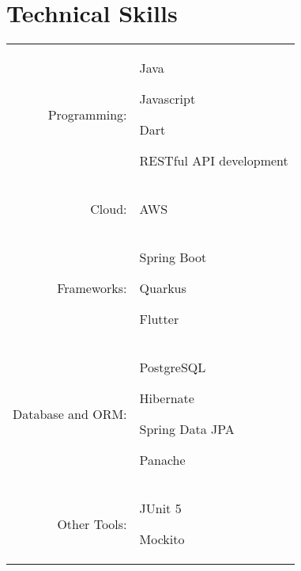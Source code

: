 \documentclass[a4paper,12pt]{article}
\begin{document}

\section{Technical Skills}
\vspace{2pt}
\begin{tabular}{rp{15.2cm}}
\raggedleft Programming:
& \begin{itemize*}[label=\Large\textbullet] %
    \item Java
    \item Javascript
    \item Dart
    \item RESTful API development
\end{itemize*}\\
\raggedleft Cloud:
& \begin{itemize*}[label=\Large\textbullet]
    \item AWS
\end{itemize*}\\
\raggedleft Frameworks:
& \begin{itemize*}[label=\Large\textbullet]
    \item Spring Boot
    \item Quarkus
    \item Flutter
\end{itemize*}\\
\raggedleft Database and ORM:
& \begin{itemize*}[label=\Large\textbullet]
    \item PostgreSQL
    \item Hibernate
    \item Spring Data JPA
    \item Panache
\end{itemize*}\\
\raggedleft Other Tools:
& \begin{itemize*}[label=\Large\textbullet]
    \item JUnit 5
    \item Mockito

\end{itemize*}
\end{tabular}
\end{document}

